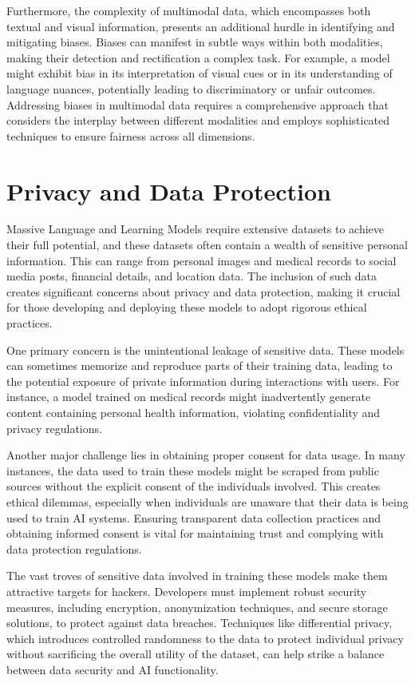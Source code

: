 Furthermore, the complexity of multimodal data, which encompasses both textual and visual information, presents an additional hurdle in identifying and mitigating biases. Biases can manifest in subtle ways within both modalities, making their detection and rectification a complex task. For example, a model might exhibit bias in its interpretation of visual cues or in its understanding of language nuances, potentially leading to discriminatory or unfair outcomes. Addressing biases in multimodal data requires a comprehensive approach that considers the interplay between different modalities and employs sophisticated techniques to ensure fairness across all dimensions.

\section{Privacy and Data Protection}

Massive Language and Learning Models require extensive datasets to achieve their full potential, and these datasets often contain a wealth of sensitive personal information. This can range from personal images and medical records to social media posts, financial details, and location data. The inclusion of such data creates significant concerns about privacy and data protection, making it crucial for those developing and deploying these models to adopt rigorous ethical practices.

One primary concern is the unintentional leakage of sensitive data. These models can sometimes memorize and reproduce parts of their training data, leading to the potential exposure of private information during interactions with users. For instance, a model trained on medical records might inadvertently generate content containing personal health information, violating confidentiality and privacy regulations.

Another major challenge lies in obtaining proper consent for data usage. In many instances, the data used to train these models might be scraped from public sources without the explicit consent of the individuals involved. This creates ethical dilemmas, especially when individuals are unaware that their data is being used to train AI systems. Ensuring transparent data collection practices and obtaining informed consent is vital for maintaining trust and complying with data protection regulations.

The vast troves of sensitive data involved in training these models make them attractive targets for hackers. Developers must implement robust security measures, including encryption, anonymization techniques, and secure storage solutions, to protect against data breaches. Techniques like differential privacy, which introduces controlled randomness to the data to protect individual privacy without sacrificing the overall utility of the dataset, can help strike a balance between data security and AI functionality.

